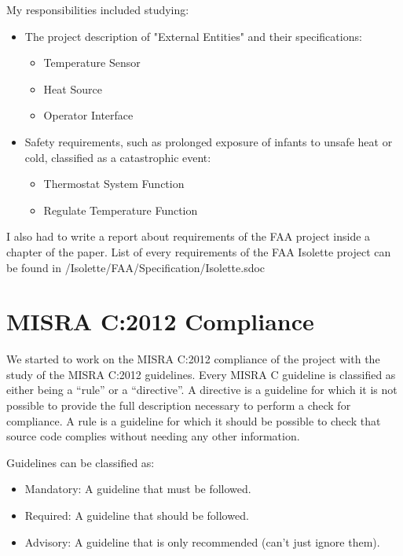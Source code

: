 \documentclass[a4paper, 12pt]{article}
\begin{document}
My responsibilities included studying:

\begin{itemize}
    \item The project description of "External Entities" and their specifications:
    \begin{itemize}
        \item Temperature Sensor
        \item Heat Source
        \item Operator Interface
    \end{itemize}
    \item Safety requirements, such as prolonged exposure of infants to unsafe heat or cold, classified as a catastrophic event:
    \begin{itemize}
        \item Thermostat System Function
        \item Regulate Temperature Function
    \end{itemize}
\end{itemize}

I also had to write a report about requirements of the FAA project inside a chapter of the paper.
List of every requirements of the FAA Isolette project can be found in /Isolette/FAA/Specification/Isolette.sdoc

\section{MISRA C:2012 Compliance}

We started to work on the MISRA C:2012 compliance of the project with the study of the MISRA C:2012 guidelines.
Every MISRA C guideline is classified as either being a “rule” or a “directive”.
A directive is a guideline for which it is not possible to provide the full description necessary to perform a check for compliance.
A rule is a guideline for which it should be possible to check that source code complies without needing any other information.

Guidelines can be classified as:
\begin{itemize}
    \item Mandatory: A guideline that must be followed.
    \item Required: A guideline that should be followed.
    \item Advisory: A guideline that is only recommended (can't just ignore them).
\end{itemize}
\end{document}
